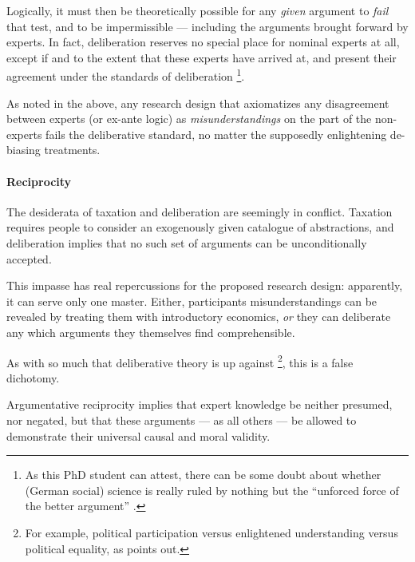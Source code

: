 Logically, it must then be theoretically possible for any \emph{given} argument to \emph{fail} that test, and to be impermissible --- including the arguments brought forward by experts.
In fact, deliberation reserves no special place for nominal experts at all, except if and to the extent that these experts have arrived at, and present their agreement under the standards of deliberation
\footnote{
	As this PhD student can attest, there can be some doubt about whether (German social) science is really ruled by nothing but the ``unforced force of the better argument'' \cite[305]{Habermas1996}.
}.
	
As noted in the above, any research design that axiomatizes any disagreement between experts (or ex-ante logic) as \emph{misunderstandings} on the part of the non-experts fails the deliberative standard, no matter the supposedly enlightening de-biasing treatments.

\paragraph{Reciprocity}
The desiderata of taxation and deliberation are seemingly in conflict.
Taxation requires people to consider an exogenously given catalogue of abstractions, and deliberation implies that no such set of arguments can be unconditionally accepted.

This impasse has real repercussions for the proposed research design: apparently, it can serve only one master.
Either, participants misunderstandings can be revealed by treating them with introductory economics, \emph{or} they can deliberate any which arguments they themselves find comprehensible.

As with so much that deliberative theory is up against
\footnote{
	For example, political participation versus enlightened understanding versus political equality, as \citeauthor{Fishkin2009} points out.
}, %
this is a false dichotomy.

Argumentative reciprocity implies that expert knowledge be neither presumed, nor negated, but that these arguments --- as all others --- be allowed to demonstrate their universal causal and moral validity.


